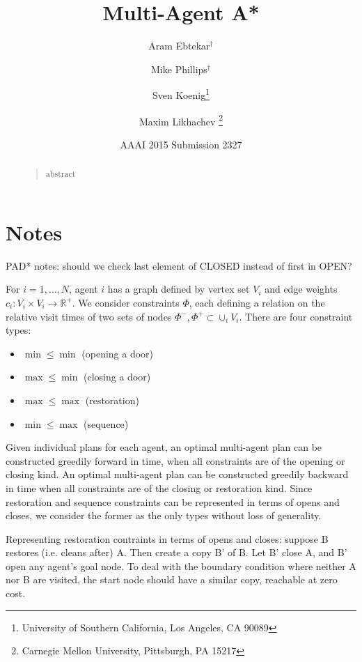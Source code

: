 \documentclass[letterpaper]{article}
\begin{document}
%
\title{Multi-Agent A*}
\author{Aram Ebtekar$^\dagger$ \and Mike Phillips$^\dagger$ \and Sven Koenig\thanks{University of Southern California, Los Angeles, CA 90089} \and Maxim Likhachev%
\thanks{Carnegie Mellon University, Pittsburgh, PA 15217}%
%
}
\author{AAAI 2015 Submission 2327}%
\maketitle
\begin{abstract}
\begin{quote}
abstract
\end{quote}
\end{abstract}

\section{Notes}

PAD* notes: should we check last element of CLOSED instead of first in OPEN?

For $i=1,\ldots,N$, agent $i$ has a graph defined by vertex set $V_i$ and edge weights $c_i : V_i \times V_i \rightarrow \mathbb R^+$. We consider constraints $\Phi$, each defining a relation on the relative visit times of two sets of nodes $\Phi^-,\Phi^+\subset \cup_i V_i$. There are four constraint types:

\begin{itemize}
\item $\min \le \min$ (opening a door)
\item $\max \le \min$ (closing a door)
\item $\max \le \max$ (restoration)
\item $\min \le \max$ (sequence)
\end{itemize}

Given individual plans for each agent, an optimal multi-agent plan can be constructed greedily forward in time, when all constraints are of the opening or closing kind. An optimal multi-agent plan can be constructed greedily backward in time when all constraints are of the closing or restoration kind. Since restoration and sequence constraints can be represented in terms of opens and closes, we consider the former as the only types without loss of generality.

Representing restoration contraints in terms of opens and closes: suppose B restores (i.e. cleans after) A. Then create a copy B' of B. Let B' close A, and B' open any agent's goal node. To deal with the boundary condition where neither A nor B are visited, the start node should have a similar copy, reachable at zero cost.
\end{document}
